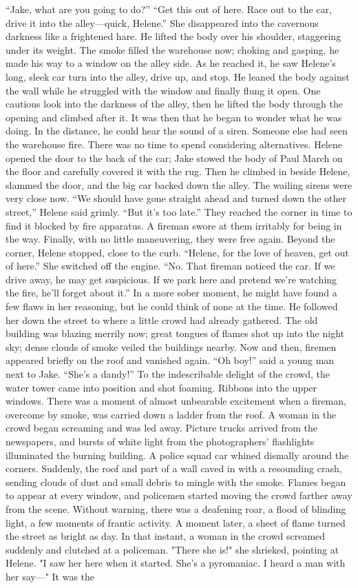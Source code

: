 \documentclass{novel}
\begin{document}
“Jake, what are you going to do?” “Get this out of here. Race out to the car, drive it into the alley—quick, Helene.” She disappeared into the cavernous darkness like a frightened hare. He lifted the body over his shoulder, staggering under its weight. The smoke filled the warehouse now; choking and gasping, he made his way to a window on the alley side. As he reached it, he saw Helene’s long, sleek car turn into the alley, drive up, and stop. He leaned the body against the wall while he struggled with the window and finally flung it open. One cautious look into the darkness of the alley, then he lifted the body through the opening and climbed after it. It was then that he began to wonder what he was doing. In the distance, he could hear the sound of a siren. Someone else had seen the warehouse fire. There was no time to spend considering alternatives. Helene opened the door to the back of the car; Jake stowed the body of Paul March on the floor and carefully covered it with the rug. Then he climbed in beside Helene, slammed the door, and the big car backed down the alley. The wailing sirens were very close now. “We should have gone straight ahead and turned down the other street,” Helene said grimly. “But it’s too late.” They reached the corner in time to find it blocked by fire apparatus. A fireman swore at them irritably for being in the way. Finally, with no little maneuvering, they were free again. Beyond the corner, Helene stopped, close to the curb. “Helene, for the love of heaven, get out of here.” She switched off the engine. “No. That fireman noticed the car. If we drive away, he may get suspicious. If we park here and pretend we’re watching the fire, he’ll forget about it.” In a more sober moment, he might have found a few flaws in her reasoning, but he could think of none at the time. He followed her down the street to where a little crowd had already gathered. The old building was blazing merrily now; great tongues of flames shot up into the night sky; dense clouds of smoke veiled the buildings nearby. Now and then, firemen appeared briefly on the roof and vanished again. “Oh boy!” said a young man next to Jake. “She’s a dandy!” To the indescribable delight of the crowd, the water tower came into position and shot foaming. Ribbons into the upper windows. There was a moment of almost unbearable excitement when a fireman, overcome by smoke, was carried down a ladder from the roof. A woman in the crowd began screaming and was led away. Picture trucks arrived from the newspapers, and bursts of white light from the photographers' flashlights illuminated the burning building. A police squad car whined dismally around the corners. Suddenly, the roof and part of a wall caved in with a resounding crash, sending clouds of dust and small debris to mingle with the smoke. Flames began to appear at every window, and policemen started moving the crowd farther away from the scene. Without warning, there was a deafening roar, a flood of blinding light, a few moments of frantic activity. A moment later, a sheet of flame turned the street as bright as day. In that instant, a woman in the crowd screamed suddenly and clutched at a policeman. "There she is!" she shrieked, pointing at Helene. "I saw her here when it started. She's a pyromaniac. I heard a man with her say—" It was the 
\end{document}
